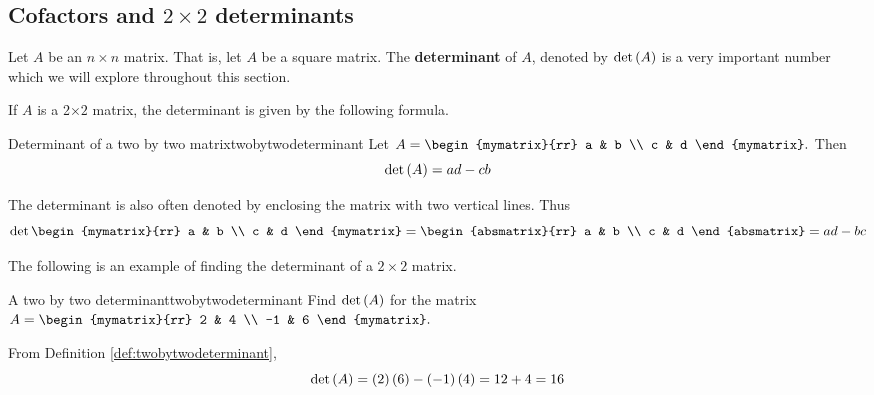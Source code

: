 \subsection{Cofactors and \texorpdfstring{$2\times 2$}{2x2} determinants}

Let $A$ be an $n\times n$ matrix. That is, let $A$ be a square matrix. The \textbf{determinant} of $A$, denoted
by $\det \left(A\right) $ is a very important number which we will explore throughout this section. 

If $A$ is a 2$\times 2$
matrix, the determinant is given by the following formula.

\begin{definition}{Determinant of a two by two matrix}{twobytwodeterminant}
Let $A=\begin{mymatrix}{rr}
a & b \\
c & d
\end{mymatrix} .$ Then
\begin{equation*}
\det \left(A\right)  = ad-cb
\end{equation*}
\end{definition}

The determinant is also often denoted by enclosing the matrix with two
vertical lines. Thus
\begin{equation*}
\det \begin{mymatrix}{rr}
a & b \\
c & d
\end{mymatrix} =\begin{absmatrix}{rr}
a & b \\
c & d
\end{absmatrix} 
=ad - bc
\end{equation*}

The following is an example of finding the determinant of a $2 \times 2$ matrix.

\begin{example}{A two by two determinant}{twobytwodeterminant}
Find $\det\left(A\right) $ for the matrix
$A =  \begin{mymatrix}{rr}
2 & 4 \\
-1 & 6
\end{mymatrix} .$
\end{example}

\begin{solution} From Definition \ref{def:twobytwodeterminant},
\begin{equation*}
\det \left(A\right) = \left(2\right) \left(6\right) -\left(
-1\right) \left(4\right) = 12 + 4 = 16
\end{equation*}
\end{solution} 

